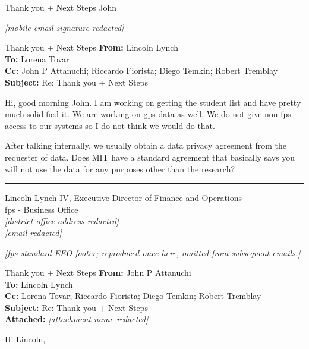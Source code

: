 {\begin{emailbox}{Thank you + Next Steps}
    John \vspace{1em}
    
    \textit{[mobile email signature redacted]}
\end{emailbox}

\begin{emailbox}{Thank you + Next Steps}
    \textbf{From:} Lincoln Lynch \\
    \textbf{To:} Lorena Tovar \\
    \textbf{Cc:} John P Attanuchi; Riccardo Fiorista; Diego Temkin; Robert Tremblay \\
    \textbf{Subject:} Re: Thank you + Next Steps

    \vspace{1em}
    Hi, good morning John. I am working on getting the student list and have pretty much solidified it. We are working on \lowercase{\acrshort{gps}} data as well. We do not give non-\acrlong{fps} access to our systems so I do not think we would do that. \vspace{1em}

    After talking internally, we usually obtain a data privacy agreement from the requester of data. Does MIT have a standard agreement that basically says you will not use the data for any purposes other than the research?
    
    \noindent\rule{\textwidth}{1pt}

    Lincoln Lynch IV, Executive Director of Finance and Operations \\
    \Acrlong{fps} - Business Office \\
    \textit{[district office address redacted]} \\
    \textit{[email redacted]} \vspace{1em}

    \textit{[\gls{fps} standard EEO footer; reproduced once here, omitted from subsequent emails.]}
\end{emailbox}

\begin{emailbox}{Thank you + Next Steps}
    \textbf{From:} John P Attanuchi \\
    \textbf{To:} Lincoln Lynch \\
    \textbf{Cc:} Lorena Tovar; Riccardo Fiorista; Diego Temkin; Robert Tremblay \\
    \textbf{Subject:} Re: Thank you + Next Steps \\
    \textbf{Attached:} \textit{[attachment name redacted]}

    \vspace{1em}
    Hi Lincoln,


\end{emailbox}}
